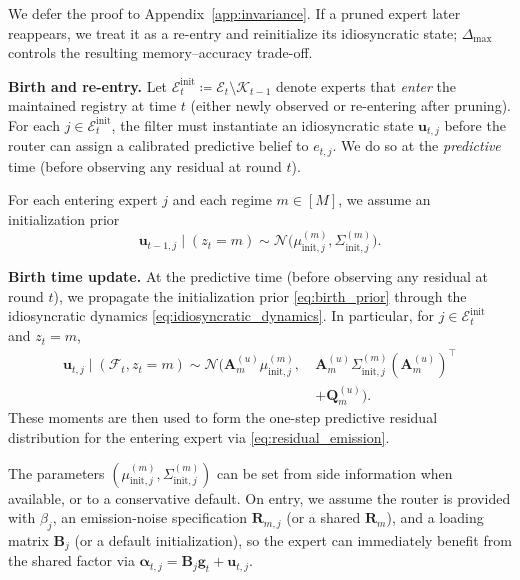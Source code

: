 We defer the proof to Appendix~\ref{app:invariance}. If a pruned expert later reappears, we treat it
as a re-entry and reinitialize its idiosyncratic state; \(\Delta_{\max}\) controls the resulting
memory--accuracy trade-off.

\textbf{Birth and re-entry.}
Let
\(\mathcal{E}^{\mathrm{init}}_t\coloneqq \mathcal{E}_t\setminus \mathcal{K}_{t-1}\)
denote experts that \emph{enter} the maintained registry at time \(t\) (either newly observed or
re-entering after pruning). For each \(j\in\mathcal{E}^{\mathrm{init}}_t\), the filter must
instantiate an idiosyncratic state \(\mathbf{u}_{t,j}\) before the router can assign a calibrated
predictive belief to \(e_{t,j}\). We do so at the \emph{predictive} time (before observing any
residual at round \(t\)).

For each entering expert \(j\) and each regime \(m\in[M]\), we assume an
initialization prior
\begin{equation}
\label{eq:birth_prior}
\mathbf{u}_{t-1,j}\mid(z_t=m)\sim \mathcal{N}\big(\mu^{(m)}_{\mathrm{init},j},\Sigma^{(m)}_{\mathrm{init},j}\big).
\end{equation}

\textbf{Birth time update.}
At the predictive time (before observing any residual at round \(t\)), we propagate the
initialization prior \eqref{eq:birth_prior} through the idiosyncratic dynamics
\eqref{eq:idiosyncratic_dynamics}. In particular, for \(j\in\mathcal{E}^{\mathrm{init}}_t\) and \(z_t=m\),
\begin{equation}
\label{eq:birth_time_update}
\begin{aligned}
    \mathbf{u}_{t,j}\mid(\mathcal{F}_t,z_t=m)
\sim
\mathcal{N}\!\Big(\mathbf{A}^{(u)}_{m}\mu^{(m)}_{\mathrm{init},j},\ &\mathbf{A}^{(u)}_{m}\Sigma^{(m)}_{\mathrm{init},j}(\mathbf{A}^{(u)}_{m})^\top \\
& +\mathbf{Q}^{(u)}_{m}\Big).
\end{aligned}
\end{equation}
These moments are then used to form the one-step predictive residual distribution for the entering
expert via \eqref{eq:residual_emission}.

The parameters \((\mu^{(m)}_{\mathrm{init},j},\Sigma^{(m)}_{\mathrm{init},j})\) can be set from side
information when available, or to a conservative default. On entry, we assume the router is provided
with \(\beta_j\), an emission-noise specification \(\mathbf{R}_{m,j}\) (or a shared \(\mathbf{R}_m\)),
and a loading matrix \(\mathbf B_j\) (or a default initialization), so the expert can immediately
benefit from the shared factor via \(\boldsymbol\alpha_{t,j}=\mathbf B_j\mathbf g_t+\mathbf u_{t,j}\).

